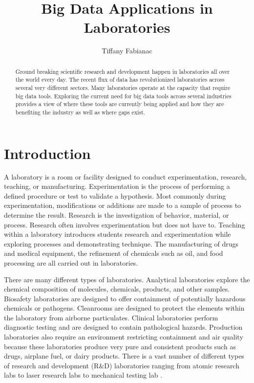 \documentclass[sigconf]{acmart}
\begin{document}
\title{Big Data Applications in Laboratories}

\author{Tiffany Fabianac} 
 \renewcommand{\shortauthors}{T. Fabianac} 

\begin{abstract}
Ground breaking scientific research and development happen in laboratories all over the world every day. The recent flux of data has revolutionized laboratories across several very different sectors. Many laboratories operate at the capacity that require big data tools. Exploring the current need for big data tools across several industries provides a view of where these tools are currently being applied and how they are benefiting the industry as well as where gaps exist.
\end{abstract}

\maketitle
\section{Introduction}
A laboratory is a room or facility designed to conduct experimentation, research, teaching, or manufacturing. Experimentation is the process of performing a defined procedure or test to validate a hypothesis. Most commonly during experimentation, modifications or additions are made to a sample of process to determine the result.  Research is the investigation of behavior, material, or process.  Research often involves experimentation but does not have to. Teaching within a laboratory introduces students research and experimentation while exploring processes and demonstrating technique. The manufacturing of drugs and medical equipment, the refinement of chemicals such as oil, and food processing are all carried out in laboratories.

There are many different types of laboratories. Analytical laboratories explore the chemical composition of molecules, chemicals, products, and other samples. Biosafety laboratories are designed to offer containment of potentially hazardous chemicals or pathogens. Cleanrooms are designed to protect the elements within the laboratory from airborne particulates. Clinical laboratories perform diagnostic testing and are designed to contain pathological hazards. Production laboratories also require an environment restricting containment and air quality because these laboratories produce very pure and consistent products such as drugs, airplane fuel, or dairy products. There is a vast number of different types of research and development (R\&D) laboratories ranging from atomic research labs to laser research labs to mechanical testing lab \cite{www-exilab}. 
\end{document}
